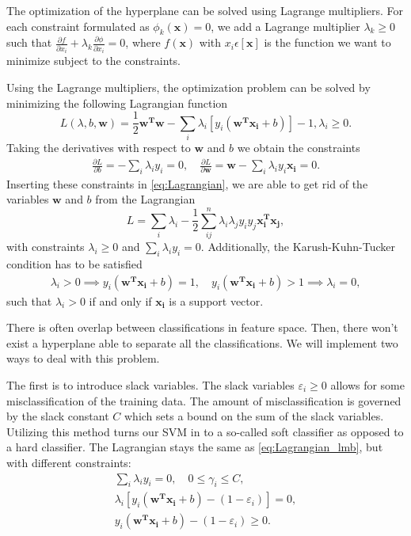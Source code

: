 The optimization of the hyperplane can be solved using Lagrange multipliers. 
For each constraint formulated as $\phi_k (\boldsymbol{x})=0$, we add a Lagrange
multiplier $\lambda _k \ge 0$ such that $\frac{\partial f}{\partial x_i}+\lambda_k \frac{\partial \phi }{\partial x_i}=0$,
where $f(\boldsymbol{x})$ with $x_i \epsilon [\boldsymbol{x}]$ is the function we want to minimize 
subject to the constraints.

Using the Lagrange multipliers, the optimization problem can be solved by minimizing 
the following Lagrangian function
\begin{equation}
	L(\lambda ,b,\boldsymbol{w})=\frac{1}{2}\boldsymbol{w^Tw}-\sum_{i} \lambda _i[y_i(\boldsymbol{w^Tx_i}+b)]-1,\lambda _i \ge0. 
	\label{eq:Lagrangian}
\end{equation}
Taking the derivatives with respect to $\boldsymbol{w}$ and $b$ we obtain the constraints 
\begin{gather*}
\frac{\partial L}{\partial b}=-\sum_{i} \lambda _i y_i=0,
\quad \frac{\partial L}{\partial \boldsymbol{w} }= \boldsymbol{w} -\sum_{i} \lambda _i y_i \boldsymbol{x_i} =0.
\end{gather*}
Inserting these constraints in \autoref{eq:Lagrangian}, we are able to get rid 
of the variables $\boldsymbol{w}$ and $b$ from the Lagrangian
\begin{equation}
L = \sum_{i} \lambda _i - \frac{1}{2}\sum_{ij}^{n} \lambda _i \lambda _j y_i y_j \boldsymbol{x_i^Tx_j},
\label{eq:Lagrangian_lmb}
\end{equation}
with constraints $\lambda _i \ge 0$ and $\sum_{i} \lambda _iy_i=0$.
Additionally, the Karush-Kuhn-Tucker condition has to be satisfied
\begin{gather*}
\lambda _i >0 \implies y_i(\boldsymbol{w^Tx_i}+b)=1, \quad y_i(\boldsymbol{w^Tx_i}+b)>1 \implies \lambda _i = 0,
\end{gather*}
such that $\lambda _i>0$ if and only if $\boldsymbol{x_i}$ is a support vector. 

There is often overlap between classifications in feature space. Then, there 
won't exist a hyperplane able to separate all the classifications. We will 
implement two ways to deal with this problem. 

The first is to introduce slack variables. The slack variables 
$\varepsilon _i \ge  0$ allows for some misclassification of 
the training data. The amount of misclassification is governed by the 
slack constant $C$ which sets a bound on the sum of the slack variables.  
Utilizing this method turns our SVM in to a so-called soft classifier as 
opposed to a hard classifier. 
The Lagrangian stays the same as \autoref{eq:Lagrangian_lmb}, but 
with different constraints:
\begin{gather*}
	\sum_{i} \lambda _i y_i = 0, \quad 0 \le \gamma _i \le C,\\
	\lambda _i[y_i(\boldsymbol{w^Tx_i}+b)-(1-\varepsilon _i)]=0,\\
y_i(\boldsymbol{w^Tx_i}+b)-(1-\varepsilon _i) \ge 0.
\end{gather*}

